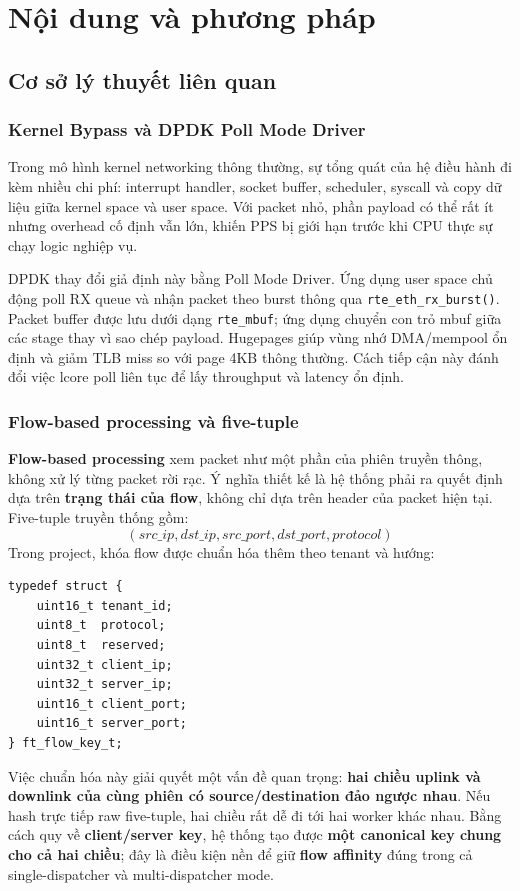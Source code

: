 \documentclass[12pt,a4paper,twoside]{report}
\newcommand{\code}[1]{\texttt{#1}}
\begin{document}
\newpage
\chapter{Nội dung và phương pháp}

\section{Cơ sở lý thuyết liên quan}

\subsection{Kernel Bypass và DPDK Poll Mode Driver}
Trong mô hình kernel networking thông thường, sự tổng quát của hệ điều hành đi
kèm nhiều chi phí: interrupt handler, socket buffer, scheduler, syscall và copy
dữ liệu giữa kernel space và user space. Với packet nhỏ, phần payload có thể rất
ít nhưng overhead cố định vẫn lớn, khiến PPS bị giới hạn trước khi CPU thực sự
chạy logic nghiệp vụ.

DPDK thay đổi giả định này bằng Poll Mode Driver. Ứng dụng user space chủ động
poll RX queue và nhận packet theo burst thông qua \code{rte\_eth\_rx\_burst()}.
Packet buffer được lưu dưới dạng \code{rte\_mbuf}; ứng dụng chuyển con trỏ mbuf
giữa các stage thay vì sao chép payload. Hugepages giúp vùng nhớ DMA/mempool
ổn định và giảm TLB miss so với page 4KB thông thường. Cách tiếp cận này đánh
đổi việc lcore poll liên tục để lấy throughput và latency ổn định.

\subsection{Flow-based processing và five-tuple}
\textbf{Flow-based processing} xem packet như một phần của phiên truyền thông,
không xử lý từng packet rời rạc. Ý nghĩa thiết kế là hệ thống phải ra quyết
định dựa trên \textbf{trạng thái của flow}, không chỉ dựa trên header của packet
hiện tại. Five-tuple truyền thống gồm:
\[
  (src\_ip, dst\_ip, src\_port, dst\_port, protocol)
\]
Trong project, khóa flow được chuẩn hóa thêm theo tenant và hướng:
\begin{verbatim}
typedef struct {
    uint16_t tenant_id;
    uint8_t  protocol;
    uint8_t  reserved;
    uint32_t client_ip;
    uint32_t server_ip;
    uint16_t client_port;
    uint16_t server_port;
} ft_flow_key_t;
\end{verbatim}

Việc chuẩn hóa này giải quyết một vấn đề quan trọng: \textbf{hai chiều uplink
và downlink của cùng phiên có source/destination đảo ngược nhau}. Nếu hash trực
tiếp raw five-tuple, hai chiều rất dễ đi tới hai worker khác nhau. Bằng cách
quy về \textbf{client/server key}, hệ thống tạo được \textbf{một canonical key
chung cho cả hai chiều}; đây là điều kiện nền để giữ \textbf{flow affinity}
đúng trong cả single-dispatcher và multi-dispatcher mode.
\end{document}
